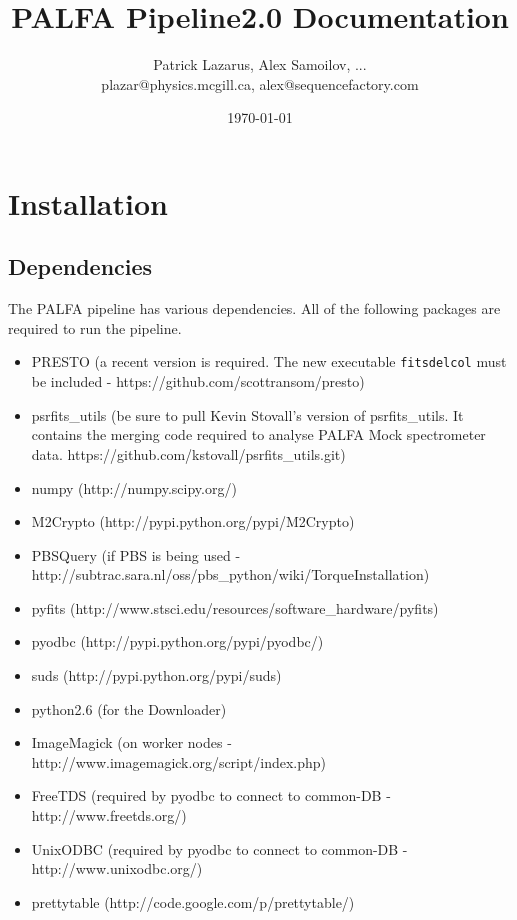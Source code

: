 


\title{PALFA Pipeline2.0 Documentation}
\author{Patrick Lazarus, Alex Samoilov, ... \\
        plazar@physics.mcgill.ca, alex@sequencefactory.com}
\date{\today}

\maketitle

\begin{abstract}
\end{abstract}

\section{Installation}
\subsection{Dependencies}
The PALFA pipeline has various dependencies. All of the following packages are required to run the pipeline.
\begin{itemize}
    \item PRESTO (a recent version is required. The new executable \texttt{fitsdelcol} must be included - https://github.com/scottransom/presto)
    \item psrfits\_utils (be sure to pull Kevin Stovall's version of psrfits\_utils. It contains the merging code required to analyse PALFA Mock spectrometer data. https://github.com/kstovall/psrfits\_utils.git)
    \item numpy (http://numpy.scipy.org/)
    \item M2Crypto (http://pypi.python.org/pypi/M2Crypto)
    \item PBSQuery (if PBS is being used - http://subtrac.sara.nl/oss/pbs\_python/wiki/TorqueInstallation)
    \item pyfits (http://www.stsci.edu/resources/software\_hardware/pyfits)
    \item pyodbc (http://pypi.python.org/pypi/pyodbc/)
    \item suds (http://pypi.python.org/pypi/suds)
    \item python2.6 (for the Downloader)
    \item ImageMagick (on worker nodes - http://www.imagemagick.org/script/index.php)
    \item FreeTDS (required by pyodbc to connect to common-DB - http://www.freetds.org/)
    \item UnixODBC (required by pyodbc to connect to common-DB - http://www.unixodbc.org/)
    \item prettytable (http://code.google.com/p/prettytable/)
\end{itemize}

